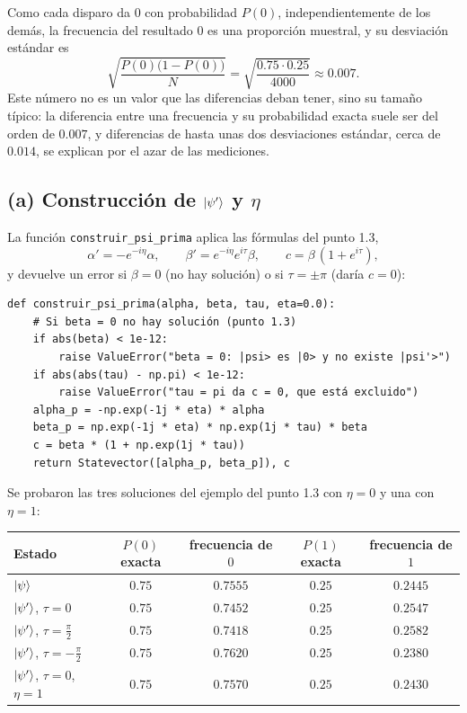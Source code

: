 Como cada disparo da $0$ con probabilidad $P(0)$, independientemente de los demás, la frecuencia
del resultado $0$ es una proporción muestral, y su desviación estándar es
\[
  \sqrt{\frac{P(0)\bigl(1-P(0)\bigr)}{N}}=\sqrt{\frac{0.75\cdot0.25}{4000}}\approx0.007 .
\]
Este número no es un valor que las diferencias deban tener, sino su tamaño típico: la diferencia
entre una frecuencia y su probabilidad exacta suele ser del orden de $0.007$, y diferencias de
hasta unas dos desviaciones estándar, cerca de $0.014$, se explican por el azar de las mediciones.

\subsection*{(a) Construcción de $\lvert \psi'\rangle$ y $\eta$}

La función \texttt{construir\_psi\_prima} aplica las fórmulas del punto 1.3,
\[
  \alpha'=-e^{-i\eta}\alpha,\qquad \beta'=e^{-i\eta}e^{i\tau}\beta,\qquad c=\beta\,(1+e^{i\tau}),
\]
y devuelve un error si $\beta=0$ (no hay solución) o si $\tau=\pm\pi$ (daría $c=0$):
\begin{verbatim}
def construir_psi_prima(alpha, beta, tau, eta=0.0):
    # Si beta = 0 no hay solución (punto 1.3)
    if abs(beta) < 1e-12:
        raise ValueError("beta = 0: |psi> es |0> y no existe |psi'>")
    if abs(abs(tau) - np.pi) < 1e-12:
        raise ValueError("tau = pi da c = 0, que está excluido")
    alpha_p = -np.exp(-1j * eta) * alpha
    beta_p = np.exp(-1j * eta) * np.exp(1j * tau) * beta
    c = beta * (1 + np.exp(1j * tau))
    return Statevector([alpha_p, beta_p]), c
\end{verbatim}
Se probaron las tres soluciones del ejemplo del punto 1.3 con $\eta=0$ y una con $\eta=1$:

\begin{center}
\renewcommand{\arraystretch}{1.3}
\begin{tabular}{lcccc}
  Estado & $P(0)$ exacta & frecuencia de $0$ & $P(1)$ exacta & frecuencia de $1$\\\hline
  $\lvert \psi\rangle$ & $0.75$ & $0.7555$ & $0.25$ & $0.2445$\\
  $\lvert \psi'\rangle$, $\tau=0$ & $0.75$ & $0.7452$ & $0.25$ & $0.2547$\\
  $\lvert \psi'\rangle$, $\tau=\frac\pi2$ & $0.75$ & $0.7418$ & $0.25$ & $0.2582$\\
  $\lvert \psi'\rangle$, $\tau=-\frac\pi2$ & $0.75$ & $0.7620$ & $0.25$ & $0.2380$\\
  $\lvert \psi'\rangle$, $\tau=0$, $\eta=1$ & $0.75$ & $0.7570$ & $0.25$ & $0.2430$
\end{tabular}
\end{center}

